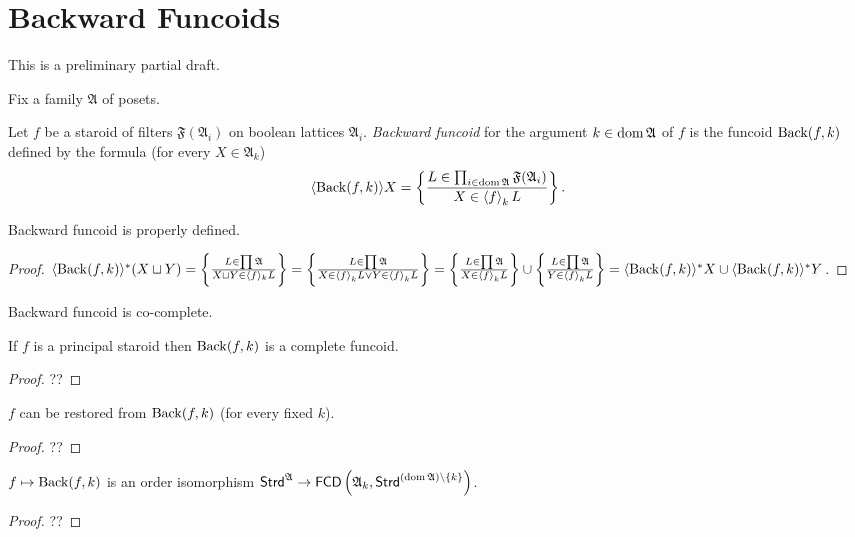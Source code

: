 \chapter{Backward Funcoids}

This is a preliminary partial draft.

Fix a family $\mathfrak{A}$ of posets.

\begin{defn}
  Let $f$ be a staroid of filters $\mathfrak{F} (\mathfrak{A}_i)$ on boolean
  lattices $\mathfrak{A}_i$. \emph{Backward funcoid} for the argument $k
  \in \operatorname{dom} \mathfrak{A}$ of $f$ is the funcoid $\operatorname{Back} (f , k)$
  defined by the formula (for every $X \in \mathfrak{A}_k$)
  \[ \langle \operatorname{Back} (f , k) \rangle X = \left\{ \frac{ L \in \prod_{i \in
     \operatorname{dom} \mathfrak{A}} \mathfrak{F} (\mathfrak{A}_i) }{
     X \in \left\langle f\right\rangle_k L }\right\} . \]
\end{defn}

\begin{prop}
  Backward funcoid is properly defined.
\end{prop}

\begin{proof}
  $\langle \operatorname{Back} (f , k) \rangle^{\ast} (X \sqcup Y) = \left\{ \frac{ L \in
  \prod \mathfrak{A} }{ X \sqcup Y \in \langle f
  \rangle_k L }\right\} = \left\{ \frac{ L \in \prod \mathfrak{A} }{
  X \in \left\langle f\right\rangle_k L \vee Y \in \left\langle f\right\rangle_k L
  }\right\} = \left\{ \frac{ L \in \prod \mathfrak{A} }{ X
  \in \left\langle f\right\rangle_k L }\right\} \cup \left\{ \frac{ L \in \prod \mathfrak{A}
  }{ Y \in \left\langle f\right\rangle_k L }\right\} = \langle
  \operatorname{Back} (f , k) \rangle^{\ast} X \cup \langle \operatorname{Back} (f , k)
  \rangle^{\ast} Y$.
\end{proof}

\begin{obvious}
Backward funcoid is co-complete.
\end{obvious}

\begin{prop}
  If $f$ is a principal staroid then $\operatorname{Back} (f , k)$ is a complete
  funcoid.
\end{prop}

\begin{proof}
  ??
\end{proof}

\begin{prop}
  $f$ can be restored from $\operatorname{Back} (f , k)$ (for every fixed $k$).
\end{prop}

\begin{proof}
  ??
\end{proof}

\begin{prop}
  $f \mapsto \operatorname{Back} (f , k)$ is an order isomorphism
  $\mathsf{Strd}^{\mathfrak{A}} \rightarrow \mathsf{FCD} \left(
  \mathfrak{A}_k , \mathsf{Strd}^{(\operatorname{dom} \mathfrak{A}) \setminus \{ k \}}
  \right)$.
\end{prop}

\begin{proof}
  ??
\end{proof}